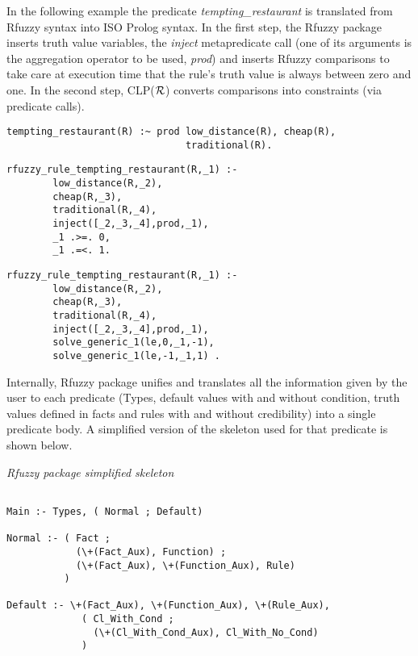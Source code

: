 \documentclass[runningheads,a4paper]{llncs}
\begin{document}
In the following example the predicate {\it tempting\_restaurant}
is translated from Rfuzzy syntax into ISO Prolog syntax.
In the first step, the Rfuzzy package inserts truth value variables, 
the {\it inject} metapredicate call
(one of its arguments is the aggregation operator to be used, 
{\it prod}) 
and inserts Rfuzzy comparisons to take care at execution time 
that the rule's truth value is always between zero and one.
In the second step, CLP(${\cal R}$) converts comparisons into 
constraints (via predicate calls).

\begin{verbatim}
tempting_restaurant(R) :~ prod low_distance(R), cheap(R), 
                               traditional(R).
\end{verbatim}

\begin{verbatim}
rfuzzy_rule_tempting_restaurant(R,_1) :-
        low_distance(R,_2),
        cheap(R,_3),
        traditional(R,_4),
        inject([_2,_3,_4],prod,_1),
        _1 .>=. 0, 
        _1 .=<. 1.
\end{verbatim}

\begin{verbatim}
rfuzzy_rule_tempting_restaurant(R,_1) :-
        low_distance(R,_2),
        cheap(R,_3),
        traditional(R,_4),
        inject([_2,_3,_4],prod,_1),
        solve_generic_1(le,0,_1,-1),
        solve_generic_1(le,-1,_1,1) .
\end{verbatim}

Internally, Rfuzzy package unifies and translates all the information
given by the user to each predicate 
(Types, default values with and without condition, truth values
defined in facts and rules with and without credibility) 
into a single predicate body. 
A simplified version of the skeleton used for that predicate is shown
below.

\medskip
\noindent
{\it Rfuzzy package simplified skeleton }
\begin{verbatim}

Main :- Types, ( Normal ; Default)
 
Normal :- ( Fact ; 
            (\+(Fact_Aux), Function) ;  
            (\+(Fact_Aux), \+(Function_Aux), Rule) 
          )

Default :- \+(Fact_Aux), \+(Function_Aux), \+(Rule_Aux), 
             ( Cl_With_Cond ; 
               (\+(Cl_With_Cond_Aux), Cl_With_No_Cond) 
             )

\end{verbatim}
\end{document}
